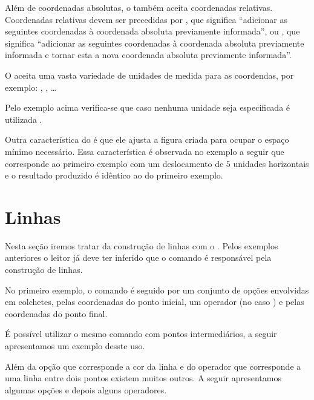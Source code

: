 
Al\'{e}m de coordenadas absolutas, o \TikZ tamb\'{e}m aceita coordenadas relativas. Coordenadas relativas devem ser precedidas por \lcode{+}, que significa ``adicionar as seguintes coordenadas \`{a} coordenada absoluta previamente informada'', ou \lcode{++}, que significa ``adicionar as seguintes coordenadas \`{a} coordenada absoluta previamente informada e tornar esta a nova coordenada absoluta previamente informada''.


O \TikZ aceita uma vasta variedade de unidades de medida para as coordendas, por exemplo: , ,  \ldots


Pelo exemplo acima verifica-se que caso nenhuma unidade seja especificada \'{e} utilizada .

Outra caracter\'{i}stica do \TikZ \'{e} que ele ajusta a figura criada para ocupar o espa\c{c}o m\'{i}nimo necess\'{a}rio. Essa caracter\'{i}stica \'{e} observada no exemplo a seguir que corresponde ao primeiro exemplo com um deslocamento de $5$ unidades horizontais e o resultado produzido \'{e} id\^{e}ntico ao do primeiro exemplo.


\section{Linhas}
Nesta se\c{c}\~{a}o iremos tratar da constru\c{c}\~{a}o de linhas com o \TikZ. Pelos exemplos anteriores o leitor j\'{a} deve ter inferido que o comando  \'{e} respons\'{a}vel pela constru\c{c}\~{a}o de linhas.

No primeiro exemplo, o comando  \'{e} seguido por um conjunto de op\c{c}\~{o}es envolvidas em colchetes, pelas coordenadas do ponto inicial, um operador (no caso \lcode{-{}-{}}) e pelas coordenadas do ponto final.

\'{E} poss\'{i}vel utilizar o mesmo comando  com pontos intermedi\'{a}rios, a seguir apresentamos um exemplo desste uso.


Al\'{e}m da op\c{c}\~{a}o  que corresponde a cor da linha e do operador \lcode{-{}-{}} que corresponde a uma linha entre dois pontos existem muitos outros. A seguir apresentamos algumas op\c{c}\~{o}es e depois alguns operadores.

